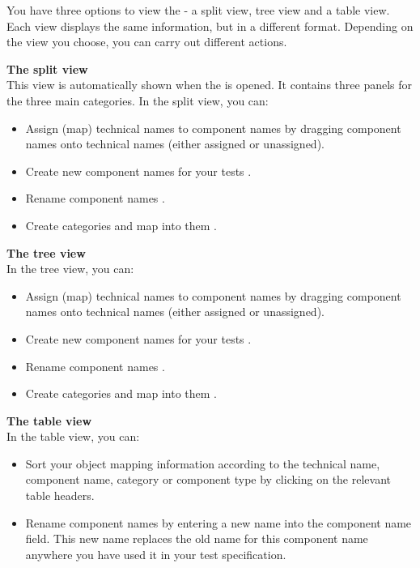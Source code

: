 
You have three options to view the \gdomeditor{} - a split view, tree view and a table view. Each view displays the same information, but in a different format. Depending on the view you choose, you can carry out different actions.  

\textbf{The split view}\\
This view is automatically shown when the \gdomeditor{} is opened. It contains three panels for the three main categories. In the split view, you can:
\begin{itemize}
\item Assign (map) technical names to component names  by dragging component names onto technical names (either assigned or unassigned). 
\item Create new component names for your tests .
\item Rename component names . 
\item Create categories and map into them .
\end{itemize}

\textbf{The tree view}\\
In the tree view, you can:
\begin{itemize}
\item Assign (map) technical names to component names  by dragging component names onto technical names (either assigned or unassigned). 
\item Create new component names for your tests .
\item Rename component names . 
\item Create categories and map into them .
\end{itemize}

\textbf{The table view}\\
In the table view, you can:
\begin{itemize}
\item Sort your object mapping information according to the technical name, component name, category or component type by clicking on the relevant table headers. 
\item Rename component names by entering a new name into the component name field. This new name replaces the old name for this component name anywhere you have used it in your test specification. 
\end{itemize}
